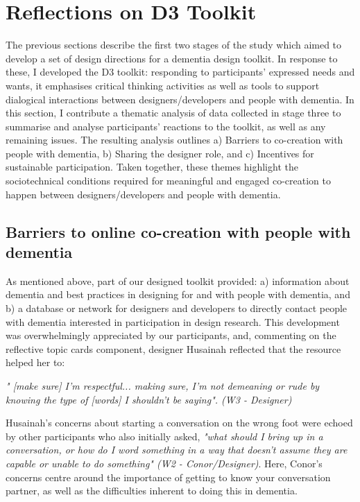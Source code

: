 \section{Reflections on D3 Toolkit}
\label{D3:Reflections}
The previous sections describe the first two stages of the study which aimed to develop a set of design directions for a dementia design toolkit. In response to these, I developed the D3 toolkit: responding to participants’ expressed needs and wants, it emphasises critical thinking activities as well as tools to support dialogical interactions between designers/developers and people with dementia. In this section, I contribute a thematic analysis of data collected in stage three to summarise and analyse participants’ reactions to the toolkit, as well as any remaining issues. The resulting analysis outlines a) Barriers to co-creation with people with dementia, b) Sharing the designer role, and c) Incentives for sustainable participation. Taken together, these themes highlight the sociotechnical conditions required for meaningful and engaged co-creation to happen between designers/developers and people with dementia. 

\subsection{Barriers to online co-creation with people with dementia}
As mentioned above, part of our designed toolkit provided: a) information about dementia and best practices in designing for and with people with dementia, and b) a database or network for designers and developers to directly contact people with dementia interested in participation in design research. This development was overwhelmingly appreciated by our participants, and, commenting on the reflective topic cards component, designer Husainah reflected that the resource helped her to:

\textit{
 " [make sure] I'm respectful... making sure, I'm not demeaning or rude by knowing the type of [words] I shouldn't be saying". (W3 - Designer)}
 
Husainah’s concerns about starting a conversation on the wrong foot were echoed by other participants who also initially asked, \textit{"what should I bring up in a conversation, or how do I word something in a way that doesn't assume they are capable or unable to do something" (W2 - Conor/Designer)}. Here, Conor’s concerns centre around the importance of getting to know your conversation partner, as well as the difficulties inherent to doing this in dementia. 

